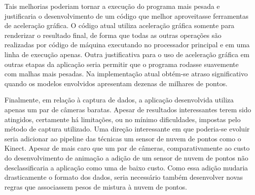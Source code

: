 Tais melhorias poderiam tornar a execução do programa mais pesada e justificaria o desenvolvimento de um código que melhor aproveitasse ferramentas de aceleração gráfica. O código atual utiliza aceleração gráfica somente para renderizar o resultado final, de forma que todas as outras operações são realizadas por código  de máquina executando no processador principal  e em uma linha de execução apenas. Outra justificativa para o uso de aceleração gráfica em outras etapas da aplicação seria permitir que o programa rodasse suavemente com malhas mais pesadas. Na implementação atual obtém-se atraso significativo quando os modelos envolvidos apresentam dezenas de milhares de pontos.

Finalmente, em relação à captura de dados, a aplicação desenvolvida utiliza apenas um par de câmeras baratas. Apesar de resultados interessantes terem sido atingidos, certamente há limitações, ou no mínimo dificuldades, impostas pelo método de captura utilizado. 
Uma direção interessante em que poderia-se evoluir seria adicionar ao pipeline das técnicas um sensor de nuvem de pontos como o Kinect. Apesar de mais caro que um par de câmeras, comparativamente ao custo do desenvolvimento de animação a adição de um sensor de nuvem de pontos não desclassificaria a aplicação como uma de baixo custo. Como essa adição mudaria drasticamente o formato dos dados, seria necessário também desenvolver novas regras que associassem pesos de mistura à nuvem de pontos.








